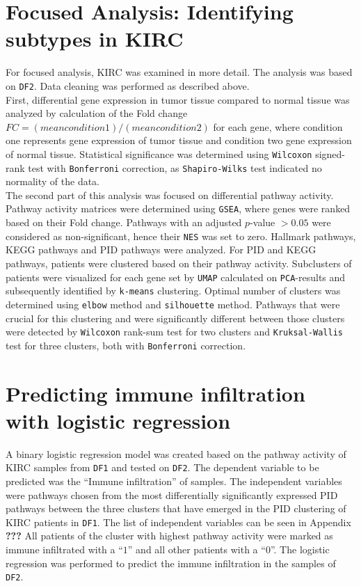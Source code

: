 \documentclass[
  parskip,
  oneside]{scrreprt}
\begin{document}
\hypertarget{focused-analysis-identifying-subtypes-in-kirc}{%
\section{Focused Analysis: Identifying subtypes in
KIRC}\label{focused-analysis-identifying-subtypes-in-kirc}}

For focused analysis, KIRC was examined in more detail. The analysis was
based on \texttt{DF2}. Data cleaning was performed as described above.\\
First, differential gene expression in tumor tissue compared to normal
tissue was analyzed by calculation of the Fold change
\(FC =(mean condition 1) / (mean condition 2)\) for each gene, where
condition one represents gene expression of tumor tissue and condition
two gene expression of normal tissue. Statistical significance was
determined using \texttt{Wilcoxon} signed-rank test with
\texttt{Bonferroni} correction, as \texttt{Shapiro-Wilks} test indicated
no normality of the data.\\
The second part of this analysis was focused on differential pathway
activity. Pathway activity matrices were determined using \texttt{GSEA},
where genes were ranked based on their Fold change. Pathways with an
adjusted \(p\)-value \(>0.05\) were considered as non-significant, hence
their \texttt{NES} was set to zero. Hallmark pathways, KEGG pathways and
PID pathways were analyzed. For PID and KEGG pathways, patients were
clustered based on their pathway activity. Subclusters of patients were
visualized for each gene set by \texttt{UMAP} calculated on
\texttt{PCA}-results and subsequently identified by \texttt{k-means}
clustering. Optimal number of clusters was determined using
\texttt{elbow} method and \texttt{silhouette} method. Pathways that were
crucial for this clustering and were significantly different between
those clusters were detected by \texttt{Wilcoxon} rank-sum test for two
clusters and \texttt{Kruksal-Wallis} test for three clusters, both with
\texttt{Bonferroni} correction.

\hypertarget{predicting-immune-infiltration-with-logistic-regression}{%
\section{Predicting immune infiltration with logistic
regression}\label{predicting-immune-infiltration-with-logistic-regression}}

A binary logistic regression model was created based on the pathway
activity of KIRC samples from \texttt{DF1} and tested on \texttt{DF2}.
The dependent variable to be predicted was the ``Immune infiltration''
of samples. The independent variables were pathways chosen from the most
differentially significantly expressed PID pathways between the three
clusters that have emerged in the PID clustering of KIRC patients in
\texttt{DF1}. The list of independent variables can be seen in Appendix
\textbf{???} All patients of the cluster with highest pathway activity
were marked as immune infiltrated with a ``\(1\)'' and all other
patients with a ``\(0\)''. The logistic regression was performed to
predict the immune infiltration in the samples of \texttt{DF2}.
\end{document}
